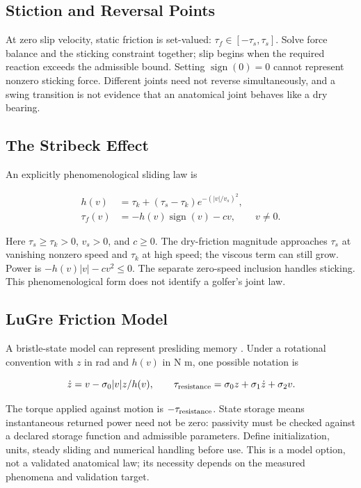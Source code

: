 \subsection{Stiction and Reversal
Points}\label{stiction-and-reversal-points}

At zero slip velocity, static friction is set-valued: \(\tau_f\in[-\tau_s,\tau_s]\). Solve force balance and the sticking constraint together; slip begins when the required reaction exceeds the admissible bound. Setting \(\operatorname{sign}(0)=0\) cannot represent nonzero sticking force. Different joints need not reverse simultaneously, and a swing transition is not evidence that an anatomical joint behaves like a dry bearing.

\subsection{The Stribeck Effect}\label{subsec:stribeck}\label{the-stribeck-effect}

An explicitly phenomenological sliding law is

\[
\begin{aligned}
h(v)&=\tau_k+(\tau_s-\tau_k)e^{-(|v|/v_s)^2},\\
\tau_f(v)&=-h(v)\operatorname{sign}(v)-cv,\qquad v\ne0.
\end{aligned}
\]

Here \(\tau_s\geq\tau_k>0\), \(v_s>0\), and \(c\geq0\). The dry-friction magnitude approaches \(\tau_s\) at vanishing nonzero speed and \(\tau_k\) at high speed; the viscous term can still grow. Power is \(-h(v)|v|-cv^2\leq0\). The separate zero-speed inclusion handles sticking. This phenomenological form does not identify a golfer's joint law.

\subsection{LuGre Friction Model}\label{lugre-friction-model}

A bristle-state model can represent presliding memory \citep{canudas1995friction}. Under a rotational convention with \(z\) in rad and \(h(v)\) in N m, one possible notation is

\[
\dot z=v-\sigma_0|v|z/h(v),\qquad
\tau_{\rm resistance}=\sigma_0z+\sigma_1\dot z+\sigma_2v.
\]

The torque applied against motion is \(-\tau_{\rm resistance}\). State storage means instantaneous returned power need not be zero: passivity must be checked against a declared storage function and admissible parameters. Define initialization, units, steady sliding and numerical handling before use. This is a model option, not a validated anatomical law; its necessity depends on the measured phenomena and validation target.

